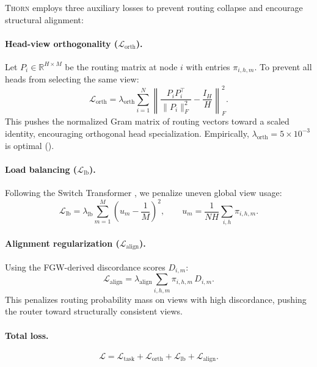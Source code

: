 \documentclass[11pt,a4paper]{article}
\newcommand{\thorn}{\textsc{Thorn}}
\newcommand{\RR}{\mathbb{R}}
\newcommand{\calL}{\mathcal{L}}
\begin{document}
\thorn{} employs three auxiliary losses to prevent routing collapse and
encourage structural alignment:

\paragraph{Head-view orthogonality ($\calL_{\mathrm{orth}}$).}
Let $P_i \in \RR^{H \times M}$ be the routing matrix at node $i$ with
entries $\pi_{i,h,m}$.
To prevent all heads from selecting the same view:
\begin{equation}
  \label{eq:lorth}
  \calL_{\mathrm{orth}} = \lambda_{\mathrm{orth}}
    \sum_{i=1}^{N} \left\lVert
      \frac{P_i P_i^\top}{\|P_i\|_F^2}
      - \frac{I_H}{H}
    \right\rVert_F^2.
\end{equation}
This pushes the normalized Gram matrix of routing vectors toward a
scaled identity, encouraging orthogonal head specialization.
Empirically, $\lambda_{\mathrm{orth}} = 5 \times 10^{-3}$ is optimal
().

\paragraph{Load balancing ($\calL_{\mathrm{lb}}$).}
Following the Switch Transformer \citep{fedus2022switch}, we penalize
uneven global view usage:
\begin{equation}
  \label{eq:llb}
  \calL_{\mathrm{lb}} = \lambda_{\mathrm{lb}}
    \sum_{m=1}^{M} \left( u_m - \frac{1}{M} \right)^2,
  \qquad
  u_m = \frac{1}{NH} \sum_{i,h} \pi_{i,h,m}.
\end{equation}

\paragraph{Alignment regularization ($\calL_{\mathrm{align}}$).}
Using the FGW-derived discordance scores $D_{i,m}$:
\begin{equation}
  \label{eq:lalign}
  \calL_{\mathrm{align}} = \lambda_{\mathrm{align}}
    \sum_{i,h,m} \pi_{i,h,m}\, D_{i,m}.
\end{equation}
This penalizes routing probability mass on views with high discordance,
pushing the router toward structurally consistent views.

\paragraph{Total loss.}
\begin{equation}
  \label{eq:totalloss}
  \calL = \calL_{\mathrm{task}} + \calL_{\mathrm{orth}}
    + \calL_{\mathrm{lb}} + \calL_{\mathrm{align}}.
\end{equation}
\end{document}
